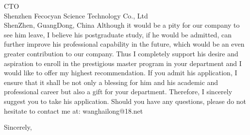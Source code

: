 \documentclass{letter}
\begin{document}
\begin{letter}{CTO \\ Shenzhen Fecocyan Science Technology Co., Ltd \\ ShenZhen, GuangDong, China}
Although it would be a pity for our company to see him leave, I believe his postgraduate study, if he would be admitted, can further improve his professional capability in the future, which would be an even greater contribution to our company. Thus I completely support his desire and aspiration to enroll in the prestigious master program in your department and I would like to offer my highest recommendation. If you admit his application, I ensure that it shall be not only a blessing for him and his academic and professional career but also a gift for your department. Therefore, I sincerely suggest you to take his application. Should you have any questions, please do not hesitate to contact me at: wanghailong@18.net

\vspace{2\parskip} %
\closing{Sincerely,}
\vspace{2\parskip} %



\end{letter}
 
\end{document}
